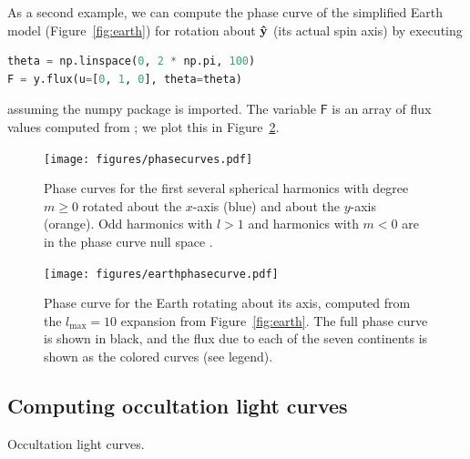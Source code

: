 \documentclass[modern]{aastex61}
\begin{document}
%

As a second example, we can compute the phase curve of the simplified Earth model
(Figure~\ref{fig:earth}) for rotation about $\mathbf{\hat{y}}$ (its actual spin axis)
by executing
%
\begin{lstlisting}[language=Python]
theta = np.linspace(0, 2 * np.pi, 100)
F = y.flux(u=[0, 1, 0], theta=theta)
\end{lstlisting}
%
assuming the \textsf{numpy} package is imported. The variable $\textsf{F}$ is
an array of flux values computed from ; we plot this in
Figure~\ref{fig:earthphasecurve}.
%
\begin{figure}[p!]
    \begin{centering}
    \texttt{[image: figures/phasecurves.pdf]}
    \caption{\label{fig:phasecurves}
             Phase curves for the first several spherical harmonics with
             degree $m \ge 0$ rotated about the $x$-axis (blue) and about
             the $y$-axis (orange).
             Odd harmonics with $l > 1$ and harmonics with $m < 0$ are
             in the phase curve null space \citep{CowanFuentesHaggard2013}.}
    \end{centering}
\end{figure}
%

%
\begin{figure}[ht!]
    \begin{centering}
    \texttt{[image: figures/earthphasecurve.pdf]}
    \caption{\label{fig:earthphasecurve}
             Phase curve for the Earth rotating about its axis, computed
             from the $l_\mathrm{max} = 10$ expansion from
             Figure~\ref{fig:earth}. The full phase curve is shown in black,
             and the flux due to each of the seven continents is shown as
             the colored curves (see legend).}
    \end{centering}
\end{figure}
%

\subsection{Computing occultation light curves}
\label{sec:starryoccultation}

Occultation light curves.

\end{document}
